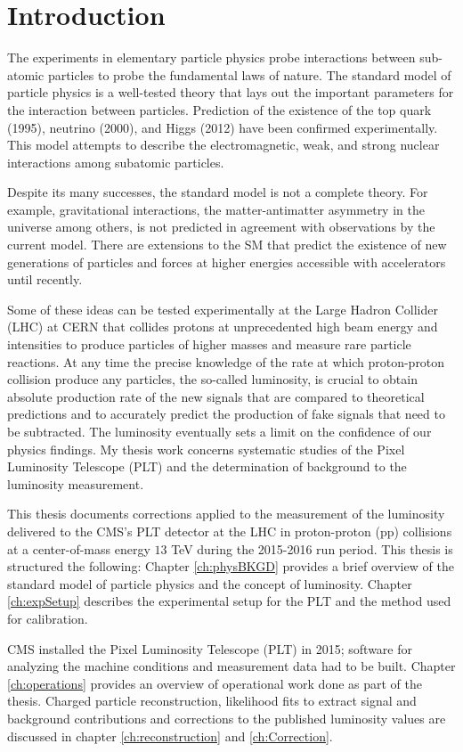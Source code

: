\chapter{Introduction} \label{ch:Introduction}
The experiments in elementary particle physics probe interactions between sub-atomic particles to probe the fundamental laws of nature. The standard model of particle physics is a well-tested theory that lays out the important parameters for the interaction between particles. Prediction of the existence of the top quark (1995), neutrino (2000), and Higgs (2012) have been confirmed experimentally. This model attempts to describe the electromagnetic, weak, and strong nuclear interactions among subatomic particles.%

Despite its many successes, the standard model is not a complete theory. For example, gravitational interactions, the matter-antimatter asymmetry in the universe among others, is not predicted in agreement with observations by the current model. There are extensions to the SM that predict the existence of new generations of particles and forces at higher energies accessible with accelerators until recently. 

Some of these ideas can be tested experimentally at the Large Hadron Collider (LHC) at CERN that collides protons at unprecedented high beam energy and intensities to produce particles of higher masses and measure rare particle reactions. At any time the precise knowledge of the rate at which proton-proton collision produce any particles, the so-called luminosity, is crucial to obtain absolute production rate of the new signals that are compared to theoretical predictions and to accurately predict the production of fake signals that need to be subtracted.
The luminosity eventually sets a limit on the confidence of our physics findings. My thesis work concerns systematic studies of the Pixel Luminosity Telescope (PLT) and the determination of background to the luminosity measurement.

This thesis documents corrections applied to the measurement of the luminosity delivered to the CMS's PLT detector at the LHC in proton-proton (pp) collisions at a center-of-mass energy $13$ TeV during the 2015-2016 run period. This thesis is structured the following: Chapter \ref{ch:physBKGD} provides a brief overview of the standard model of particle physics and the concept of luminosity. Chapter \ref{ch:expSetup} describes the experimental setup for the PLT and the method used for calibration.

CMS installed the Pixel Luminosity Telescope (PLT) in 2015; software for analyzing the machine conditions and measurement data had to be built. Chapter \ref{ch:operations} provides an overview of operational work done as part of the thesis. Charged particle reconstruction, likelihood fits to extract signal and background contributions and corrections to the published luminosity values are discussed in chapter \ref{ch:reconstruction} and \ref{ch:Correction}. 
